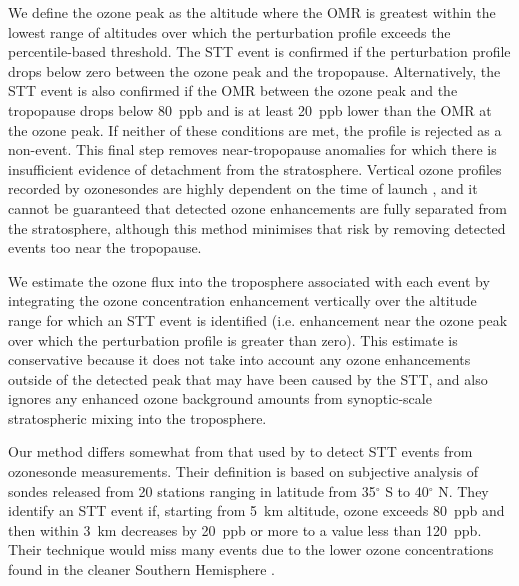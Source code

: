 \documentclass[acp, manuscript]{copernicus} %
\providecommand{\DIFadd}[1]{{\protect\color{blue}\uwave{#1}}} %
\providecommand{\DIFaddbegin}{} %
\providecommand{\DIFaddend}{} %
\begin{document}
    We define the ozone peak as the altitude where the OMR is greatest within the lowest range of altitudes over which the perturbation profile exceeds the percentile-based threshold.
    The STT event is confirmed if the perturbation profile drops below zero between the ozone peak and the tropopause. 
    Alternatively, the STT event is also confirmed if the OMR between the ozone peak and the tropopause drops below 80~ppb and is at least 20~ppb lower than the OMR at the ozone peak. 
    If neither of these conditions are met, the profile is rejected as a non-event.
    This final step removes near-tropopause anomalies for which there is insufficient evidence of detachment from the stratosphere.
    Vertical ozone profiles recorded by ozonesondes are highly dependent on the time of launch \citep{Sprenger2003}, and it cannot be guaranteed that detected ozone enhancements are fully separated from the stratosphere, although this method minimises that risk by removing detected events too near the tropopause.

    We estimate the ozone flux into the troposphere associated with each event by integrating the ozone concentration enhancement vertically over the altitude range for which an STT event is identified (i.e. enhancement near the ozone peak over which the perturbation profile is greater than zero).
    This estimate is conservative because it does not take into account any ozone enhancements outside of the detected peak that may have been caused by the STT, and also ignores any enhanced ozone background amounts from synoptic-scale stratospheric mixing into the troposphere.

    Our method differs somewhat from that used by \citet{Tang2010} to detect STT events from ozonesonde measurements. 
    Their definition is based on subjective analysis of sondes released from 20 stations ranging in latitude from 35$^\circ$ S to 40$^\circ$ N.
    They identify an STT event if, starting from 5~km altitude, ozone exceeds 80~ppb and then within 3~km decreases by 20~ppb or more to a value less than 120~ppb.
    Their technique would miss many events due to the lower ozone concentrations found in the cleaner Southern Hemisphere \DIFaddbegin \DIFadd{(SH)}\DIFaddend .
\end{document}
